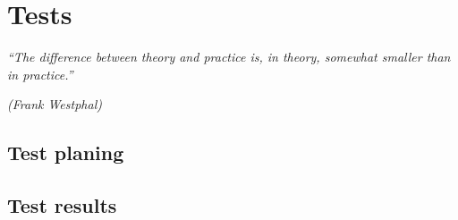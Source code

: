 \chapter{Tests}
\epigraph{\em ``The difference between theory and practice is, in theory, somewhat
smaller than in practice.''}{\em (Frank Westphal)}

\section{Test planing}

\section{Test results}